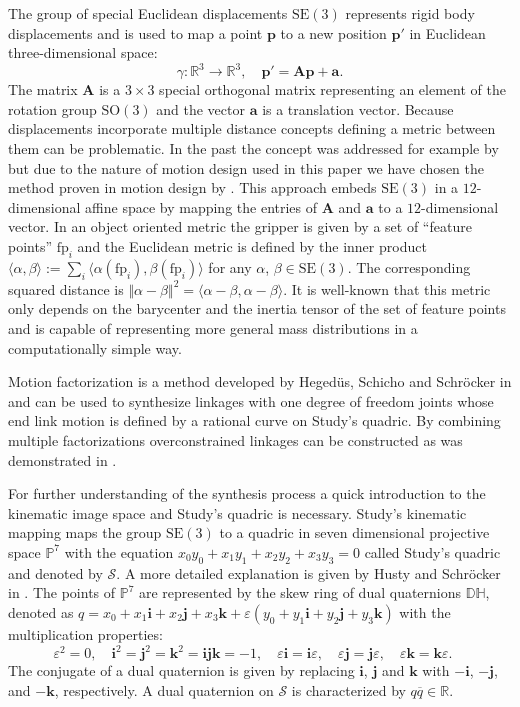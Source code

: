 \documentclass{scrartcl}
\renewcommand{\vec}[1]{\mathbf{#1}}
\newcommand{\mat}[1]{\mathbf{#1}}
\newcommand{\fp}{\text{fp}}
\newcommand{\eps}{\varepsilon}
\newcommand{\R}{\mathbb{R}}
\newcommand{\qi}{\mathbf{i}}
\newcommand{\qj}{\mathbf{j}}
\newcommand{\qk}{\mathbf{k}}
\newcommand{\cj}[1]{\overline{#1}}
\newcommand{\quadric}[1]{\mathcal{#1}}
\newcommand{\SQ}{\quadric{S}}
\newcommand{\SE}[1][3]{\mathrm{SE}(#1)}
\begin{document}
The group of special Euclidean displacements $\SE$ represents rigid body displacements and is used to map a point $\vec{p}$ to a new position $\vec{p}'$ in Euclidean three-dimensional space:
\begin{equation}
  \gamma\colon \mathbb{R}^3 \rightarrow \mathbb{R}^3,
  \quad
  \vec{p}' = \mat{A}\vec{p}+\vec{a}.
\end{equation} 
The matrix $\mat{A}$ is a $3\times3$ special orthogonal matrix representing an element of the rotation group $\mathrm{SO}(3)$ and the vector $\vec{a}$ is a translation vector. Because displacements incorporate multiple distance concepts defining a metric between them can be problematic. In the past the concept was addressed for example by \cite{contrib E metric} but due to the nature of motion design used in this paper we have chosen the method proven in motion design by \cite{journal OB metric 2}. This approach embeds $\SE$ in a $12$-dimensional affine space by mapping the entries of $\mat{A}$ and $\vec{a}$ to a $12$-dimensional vector. In an object oriented metric the gripper is given by a set of ``feature points'' $\fp_i$ and the Euclidean metric is defined by the inner product $\langle \alpha, \beta \rangle := \sum_i \langle \alpha(\fp_i), \beta(\fp_i) \rangle$ for any $\alpha$, $\beta \in \SE$. The corresponding squared distance is $\Vert \alpha-\beta \Vert^2 = \langle \alpha-\beta, \alpha-\beta \rangle$. It is well-known \cite{journal motion metric} that this metric only depends on the barycenter and the inertia tensor of the set of feature points and is capable of representing more general mass distributions in a computationally simple way.

Motion factorization is a method developed by Hegedüs, Schicho and Schröcker in
\cite{journal factorization RJ} and can be used to synthesize linkages with one
degree of freedom joints whose end link motion is defined by a rational curve on
Study's quadric. By combining multiple factorizations overconstrained linkages
can be constructed as was demonstrated in \cite{journal factorization RJ}.

For further understanding of the synthesis process a quick introduction to the
kinematic image space and Study's quadric is necessary. Study's kinematic
mapping maps the group $\SE$ to a quadric in seven dimensional projective space
$ \mathbb{P}^7$ with the equation $x_0 y_0+x_1 y_1+x_2 y_2+x_3 y_3=0$ called
Study's quadric and denoted by $\SQ$. A more detailed explanation is given by
Husty and Schröcker in \cite{Study mapping}. The points of $\mathbb{P}^7$ are
represented by the skew ring of dual quaternions $\mathbb{DH}$, denoted as
$q=x_0+x_1\qi+x_2\qj+x_3\qk + \eps(y_0+y_1\qi+y_2\qj+y_3\qk) $ with the
multiplication properties:
\begin{equation*}
  \eps^2 = 0,\quad
  \qi^2 = \qj^2 = \qk^2 = \qi\qj\qk = -1,\quad
  \eps\qi = \qi\eps,\quad
  \eps\qj = \qj\eps,\quad
  \eps\qk = \qk\eps.\quad
\end{equation*}
The conjugate of a dual quaternion is given by replacing $\qi$, $\qj$ and $\qk$
with $-\qi$, $-\qj$, and $-\qk$, respectively. A dual quaternion on $\SQ$ is
characterized by $q\cj{q} \in \R$. 
\end{document}
